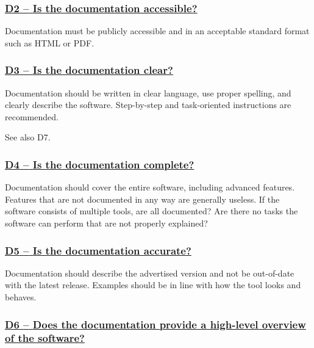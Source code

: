 \documentclass[a4paper,11pt]{article}
\newcommand{\criterion}[1]{\subsubsection*{\underline{#1}}}
\begin{document}
\newcommand{\dTwoID}{D2}
\newcommand{\dTwoText}{Is the documentation accessible?}
\criterion{\dTwoID{ }--{ }\dTwoText}\label{id:d2}

Documentation must be publicly accessible and in an acceptable standard format
such as HTML or PDF.

\newcommand{\dThreeID}{D3}
\newcommand{\dThreeText}{Is the documentation clear?}
\criterion{\dThreeID{ }--{ }\dThreeText}\label{id:d3}

Documentation should be written in clear language, use proper spelling, and
clearly describe the software. Step-by-step and task-oriented instructions are
recommended.

See also D7.

\newcommand{\dFourID}{D4}
\newcommand{\dFourText}{Is the documentation complete?}
\criterion{\dFourID{ }--{ }\dFourText}\label{id:d4}

Documentation should cover the entire software, including advanced features.
Features that are not documented in any way are generally useless. If the
software consists of multiple tools, are all documented? Are there no tasks the
software can perform that are not properly explained?

%
%
%

\newcommand{\dFiveID}{D5}
\newcommand{\dFiveText}{Is the documentation accurate?}
\criterion{\dFiveID{ }--{ }\dFiveText}\label{id:d5}

Documentation should describe the advertised version and not be out-of-date
with the latest release. Examples should be in line with how the tool looks and
behaves.

\newcommand{\dSixID}{D6}
\newcommand{\dSixText}{Does the documentation provide a high-level overview of the software?}
\criterion{\dSixID{ }--{ }\dSixText}\label{id:d6}
\end{document}
